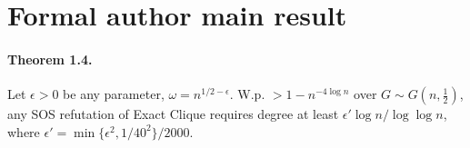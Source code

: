 \section*{Formal author main result}
\paragraph{Theorem 1.4.} Let $\epsilon>0$ be any parameter, $\omega=n^{1/2-\epsilon}$. W.p. $>1-n^{-4\log n}$ over $G\sim G(n,\frac12)$, any SOS refutation of Exact Clique requires degree at least $\epsilon'\log n/\log\log n$, where $\epsilon'=\min\{\epsilon^2,1/40^2\}/2000$.
